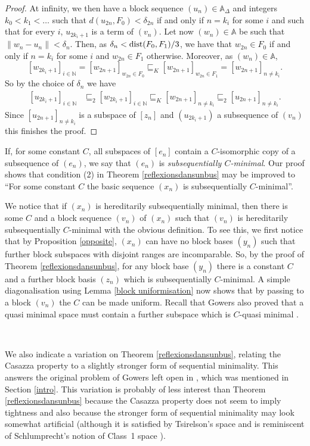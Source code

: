 \documentclass[10pt]{amsart}
\numberwithin{equation}{section}
\begin{document}
\begin{proof}
At infinity, we then have a block sequence $(u_n)\in {\mathbb A}_\Delta$ and integers
$k_0<k_1<\ldots$ such that $d(u_{2n},F_0)<\delta_{2n}$ if and only if $n=k_i$
for some $i$ and such that for every $i$, $u_{2k_i+1}$ is a term of $(v_n)$.
Let now $(w_n)\in {\mathbb A}$ be such that $\|w_n-u_n\|<\delta_n$. Then, as
$\delta_n<{\rm dist}(F_0,F_1)/3$, we have that $w_{2n}\in F_0$ if and only if
$n=k_i$ for some $i$ and $w_{2n}\in F_1$ otherwise. Moreover, as $(w_n)\in {\mathbb A}$,
$$
[w_{2k_i+1}]_{i\in {\mathbb N}}=[w_{2n+1}]_{w_{2n}\in F_0}\sqsubseteq_K [w_{2n+1}]_{w_{2n}\in F_1}=[w_{2n+1}]_{n\neq k_i}.
$$
So by the choice of $\delta_n$ we have
\[\begin{split}
[u_{2k_i+1}]_{i\in {\mathbb N}}
&\sqsubseteq_2[w_{2k_i+1}]_{i\in {\mathbb N}}\sqsubseteq_K [w_{2n+1}]_{n\neq k_i}\sqsubseteq_2 [u_{2n+1}]_{n\neq k_i}.
\end{split}\]
Since $ [u_{2n+1}]_{n\neq k_i}$ is a subspace of $[z_n]$ and $(u_{2k_i+1})$ a subsequence of $(v_n)$ this finishes the proof.
\end{proof}

If, for some constant $C$, all subspaces of $[e_n]$ contain a $C$-isomorphic
copy of a subsequence of $(e_n)$, we say that $(e_n)$ is {\em subsequentially
$C$-minimal}. Our proof shows that condition (2) in Theorem
\ref{reflexionsdansunbus} may be improved to ``For some constant $C$  the
basic sequence $(x_n)$ is subsequentially $C$-minimal''.

We notice that if $(x_n)$ is hereditarily subsequentially minimal, then there
is some $C$ and a block sequence $(v_n)$ of $(x_n)$ such that $(v_n)$ is
hereditarily subsequentially $C$-minimal with the obvious definition.  To see
this, we first notice that by Proposition \ref{opposite}, $(x_n)$ can have no
block bases  $(y_n)$ such that further block subspaces with disjoint ranges are
incomparable. So, by the proof of Theorem \ref{reflexionsdansunbus}, for any
block base $(y_n)$ there is a constant $C$ and a further block basis $(z_n)$
which is subsequentially $C$-minimal. A simple diagonalisation using Lemma
\ref{block uniformisation} now shows that  by passing to a block $(v_n)$ the
$C$ can be made uniform. Recall that Gowers also proved that a quasi minimal
space must contain a further subspace which is $C$-quasi minimal
\cite{g:dicho}.

\

We also indicate a variation on Theorem \ref{reflexionsdansunbus}, relating the
Casazza property to a slightly  stronger form of sequential minimality. This
answers the original problem of Gowers left open in \cite{g:dicho}, which was
mentioned in Section \ref{intro}. This variation is probably of less interest
than Theorem \ref{reflexionsdansunbus} because the Casazza  property  does not
seem to imply tightness and also because the stronger form of sequential
minimality may look somewhat artificial (although it is satisfied by
Tsirelson's space and is reminiscent of Schlumprecht's notion of Class~1 space
\cite{S:notes}).
\end{document}
